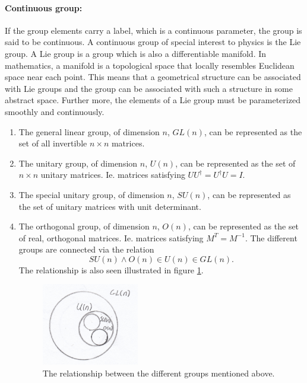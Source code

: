 \paragraph{Continuous group: }
If the group elements carry a label, which is a continuous parameter, the group is said to be continuous. A continuous group of special interest to physics is the Lie group. A Lie group is a group which is also a differentiable manifold. In mathematics, a manifold is a topological space that locally resembles Euclidean space near each point. This means that a geometrical structure can be associated with Lie groups and the group can be associated with such a structure in some abstract space. Further more, the elements of a Lie group must be parameterized smoothly and continuously.
\begin{example}
	\begin{enumerate}
		\item The general linear group, of dimension $n$, $GL(n)$, can be represented as the set of all invertible $n\times n$ matrices.
		\item The unitary group, of dimension $n$, $U(n)$, can be represented as the set of $n\times n$ unitary matrices. Ie. matrices satisfying $UU^\dagger=U^\dagger U=I$.
		\item The special unitary group, of dimension $n$, $SU(n)$, can be represented as the set of unitary matrices with unit determinant.
		\item The orthogonal group, of dimension $n$, $O(n)$, can be represented as the set of real, orthogonal matrices. Ie. matrices satisfying $M^T=M^{-1}$. The different groups are connected via the relation
		\begin{equation}
			SU(n)\wedge O(n)\in U(n)\in GL(n).
		\end{equation} 
		The relationship is also seen illustrated in figure \ref{fig:2}.
		\begin{figure}[h]
			\captionsetup{width=1\textwidth}
			\centering
			\includegraphics[width=0.4\textwidth]{figures/2}
			\caption{The relationship between the different groups mentioned above.}
			\label{fig:2}
		\end{figure}
	\end{enumerate}
\end{example}

